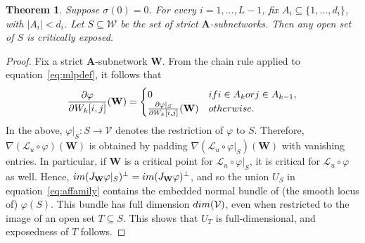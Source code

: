 \documentclass[10pt,a4paper]{amsart}
\newtheorem{thm}{Theorem}
\def\eqref#1{equation~\ref{#1}}
\newcommand{\jacob}{\textnormal{\textbf{J}}}
\begin{document}
\begin{thm}\label{thm:exposed_new}
Suppose $\sigma(0) = 0$. For every $i=1, \ldots, L-1$, fix $A_i \subseteq \{1, \ldots,  d_i \}$, with $|A_i| < d_i$. Let $S \subseteq \mathcal{W}$ be the set of strict $\mathbf{A}$-subnetworks. Then any open set of $S$ is critically exposed.   
\end{thm}

\begin{proof}
Fix a strict $\mathbf{A}$-subnetwork $\mathbf{W}$. From the chain rule applied to \eqref{eq:mlpdef}, it follows that
\begin{equation}\label{eq:backprop}
   \frac{\partial \varphi }{\partial W_k[i,j]} (\mathbf{W}) = \begin{cases}
        0 & \textnormal{ if }  i \in A_k \textnormal{ or } j \in A_{k-1}, \\
        \frac{\partial \varphi|_S }{\partial W_k[i,j]}(\mathbf{W}) &  \textnormal{ otherwise.}
    \end{cases}
\end{equation}
In the above, $\varphi|_S \colon S \rightarrow \mathcal{V}$ denotes the restriction of $\varphi$ to $S$. Therefore, $\nabla (\mathcal{L}_u \circ \varphi) (\mathbf{W})$ is obtained by padding $\nabla (\mathcal{L}_u \circ \varphi|_S) (\mathbf{W})$ with vanishing entries. In particular, if $\mathbf{W}$ is a critical point for $\mathcal{L}_u \circ \varphi|_S$, it is critical for $\mathcal{L}_u \circ \varphi$ as well. 
Hence, $\textnormal{im}( \jacob_\mathbf{W}\varphi|_S)^\perp=\textnormal{im}( \jacob_\mathbf{W}\varphi)^\perp$, and so the union $U_S$ in \eqref{eq:affamily}
contains the embedded normal bundle of (the smooth locus of) $\varphi(S)$. This bundle has full dimension $\textnormal{dim}(\mathcal{V})$, even when restricted to the image of an open set $T \subseteq S$. This shows that $U_T$ is full-dimensional, and exposedness of $T$ follows.  
\end{proof}
\end{document}
